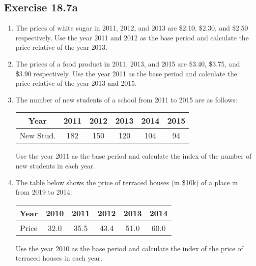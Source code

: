 \documentclass{report}
\begin{document}
\begin{multicols}{2}
  \subsection{Exercise 18.7a}

  \begin{enumerate}
    \item The prices of white sugar in 2011, 2012, and 2013 are \$2.10, \$2.30, and
          \$2.50 respectively. Use the year 2011 and 2012 as the base period and
          calculate the price relative of the year 2013.

    \item The prices of a food product in 2011, 2013, and 2015 are \$3.40, \$3.75, and
          \$3.90 respectively. Use the year 2011 as the base period and calculate the
          price relative of the year 2013 and 2015.

    \item The number of new students of a school from 2011 to 2015 are as follows:
          \begin{center}
            \begin{tabular}{|c|c|c|c|c|c|}
              \hline
              Year      & 2011 & 2012 & 2013 & 2014 & 2015 \\
              \hline
              New Stud. & 182  & 150  & 120  & 104  & 94   \\
              \hline
            \end{tabular}
          \end{center}
          Use the year 2011 as the base period and calculate the index of the number of new students in each year.

    \item The table below shows the price of terraced houses (in \$10k) of a place in
          from 2019 to 2014:
          \begin{center}
            \begin{tabular}{|c|c|c|c|c|c|}
              \hline
              Year  & 2010 & 2011 & 2012 & 2013 & 2014 \\
              \hline
              Price & 32.0 & 35.5 & 43.4 & 51.0 & 60.0 \\
              \hline
            \end{tabular}
          \end{center}
          Use the year 2010 as the base period and calculate the index of the price of terraced houses in each year.


\end{enumerate}
\end{multicols}
\end{document}
